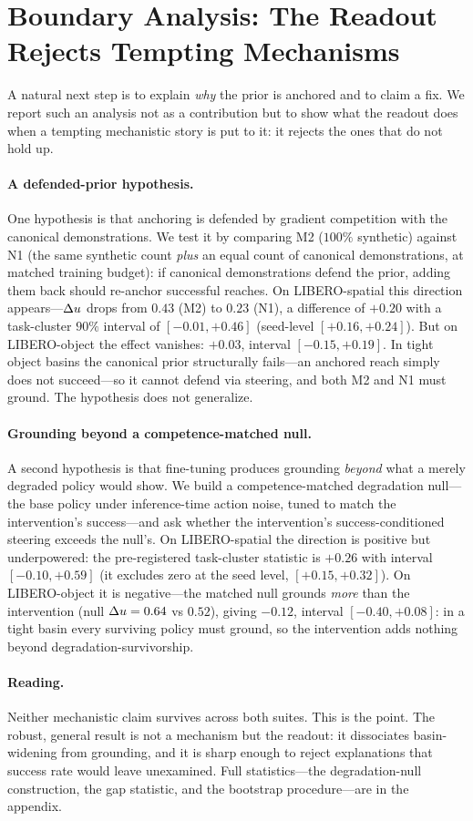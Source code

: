 \section{Boundary Analysis: The Readout Rejects Tempting Mechanisms}
\label{sec:boundary}

A natural next step is to explain \emph{why} the prior is anchored and to claim a fix. We
report such an analysis not as a contribution but to show what the readout does when a
tempting mechanistic story is put to it: it rejects the ones that do not hold up.

\paragraph{A defended-prior hypothesis.}
One hypothesis is that anchoring is defended by gradient competition with the canonical
demonstrations. We test it by comparing M2 ($100\%$ synthetic) against N1 (the same
synthetic count \emph{plus} an equal count of canonical demonstrations, at matched training
budget): if canonical demonstrations defend the prior, adding them back should re-anchor
successful reaches. On LIBERO-spatial this direction appears---$\Delta u$ drops from $0.43$
(M2) to $0.23$ (N1), a difference of $+0.20$ with a task-cluster $90\%$ interval of
$[-0.01, +0.46]$ (seed-level $[+0.16, +0.24]$). But on LIBERO-object the effect vanishes:
$+0.03$, interval $[-0.15, +0.19]$. In tight object basins the canonical prior structurally
fails---an anchored reach simply does not succeed---so it cannot defend via steering, and
both M2 and N1 must ground. The hypothesis does not generalize.

\paragraph{Grounding beyond a competence-matched null.}
A second hypothesis is that fine-tuning produces grounding \emph{beyond} what a merely
degraded policy would show. We build a competence-matched degradation null---the base
policy under inference-time action noise, tuned to match the intervention's success---and
ask whether the intervention's success-conditioned steering exceeds the null's. On
LIBERO-spatial the direction is positive but underpowered: the pre-registered task-cluster
statistic is $+0.26$ with interval $[-0.10, +0.59]$ (it excludes zero at the seed level,
$[+0.15, +0.32]$). On LIBERO-object it is negative---the matched null grounds \emph{more}
than the intervention (null $\Delta u = 0.64$ vs $0.52$), giving $-0.12$, interval
$[-0.40, +0.08]$: in a tight basin every surviving policy must ground, so the intervention
adds nothing beyond degradation-survivorship.

\paragraph{Reading.}
Neither mechanistic claim survives across both suites. This is the point. The robust,
general result is not a mechanism but the readout: it dissociates basin-widening from
grounding, and it is sharp enough to reject explanations that success rate would leave
unexamined. Full statistics---the degradation-null construction, the gap statistic, and
the bootstrap procedure---are in the appendix.
